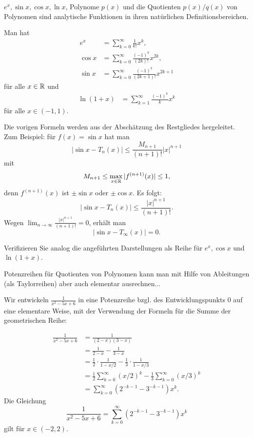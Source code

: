 \begin{thm}
	$e^x, \sin x, \cos x, \ln x$, Polynome $p(x)$ und die Quotienten $p(x)/q(x)$ von Polynomen sind analytische Funktionen in ihren natürlichen Definitionsbereichen. 
\end{thm}

\begin{thm} 
	Man hat 
	\begin{align*}
		e^x & = \sum_{k=0}^\infty \frac{1}{k!} x^k,
		\\ \cos x & = \sum_{k=0}^\infty \frac{(-1)^k}{(2k)!} x^{2k},
		\\ \sin x & = \sum_{k=0}^\infty \frac{(-1)^k}{ (2k +1)!} x^{2k+1}
	\end{align*} 
	für alle $x \in \mathbb{R}$ und 
	\begin{align*}
		\ln (1+x) & = \sum_{k=1}^\infty \frac{(-1)^k}{k} x^k
	\end{align*}
	für alle $x \in (-1,1)$. 
\end{thm} 

\begin{bem} 
	Die vorigen Formeln werden aus der Abschätzung des Restgliedes hergeleitet. Zum Beispiel: für $f(x) = \sin x$ hat man 
	\[
		| \sin x - T_n(x) | \le \frac{ M_{n+1}}{(n+1)!} |x|^{n+1}
	\]
	mit 
	\[
		M_{n+1} \le \max_{x \in \mathbb{R}} |f^{(n+1)}(x)| \le 1,
	\]
	denn $f^{(n+1)}(x)$ ist $\pm \sin x$ oder $\pm \cos x$. 
	Es folgt: 
	\[
		| \sin x - T_n(x) | \le \frac{|x|^{n+1}}{(n+1)!}. 
	\]
	Wegen $\lim_{n \to \infty} \frac{|x|^{n+1}}{(n+1)!} = 0$, erhält man 
	\[
		| \sin x - T_\infty(x)| = 0. 
	\]
\end{bem} 

\begin{aufg}
	Verifizieren Sie analog die angeführten Darstellungen als Reihe für $e^x, \cos x$ und $\ln (1+x)$. 
\end{aufg} 

\begin{bem} 
		Potenzreihen für Quotienten von Polynomen kann man mit Hilfe von Ableitungen (als Taylorreihen) aber auch elementar ausrechnen...
\end{bem} 

\begin{bsp} 
Wir entwickeln $\frac{1}{x^2 - 5 x + 6}$ in eine Potenzreihe bzgl. des Entwicklungspunkts $0$ auf eine elementare Weise, mit der Verwendung der Formeln für die Summe der geometrischen Reihe: 
	
	\begin{align*} 
			\frac{1}{x^2 - 5 x + 6}  & 
			= \frac{1}{ (2-x) (3-x) }  
			\\ & = \frac{1}{2-x} - \frac{1}{3-x} 
			\\ & = \frac{1}{2} \cdot \frac{1}{1 - x/2} - \frac{1}{3} \cdot \frac{1}{1- x/3} 
			\\ & = \frac{1}{2} \sum_{k=0}^\infty (x/2)^k - \frac{1}{3} \sum_{k=0}^\infty (x/3)^k
			\\ & = \sum_{k=0}^\infty (2^{-k-1} - 3^{-k-1}) x^k. 
	\end{align*}
	Die Gleichung 
	\[
		\frac{1}{x^2 - 5 x + 6} = \sum_{k=0}^\infty (2^{-k-1} - 3^{-k-1}) x^k
	\]
	gilt für $x \in (-2,2)$. 
\end{bsp} 

